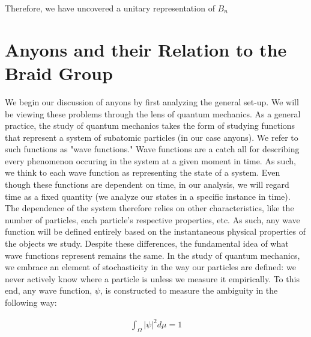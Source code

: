 \documentclass[10pt]{ucthesis}
\begin{document}
Therefore, we have uncovered a unitary representation of $B_n$

\section{Anyons and their Relation to the Braid Group}

We begin our discussion of anyons by first analyzing the general set-up. We will be viewing these problems through the lens of quantum mechanics. As a general practice, the study of quantum mechanics takes the form of studying functions that represent a system of subatomic particles (in our case anyons). We refer to such functions as "wave functions." Wave functions are a catch all for describing every phenomenon occuring in the system at a given moment in time. As such, we think to each wave function as representing the state of a system. Even though these functions are dependent on time, in our analysis, we will regard time as a fixed quantity (we analyze our states in a specific instance in time). The dependence of the system therefore relies on other characteristics, like the number of particles, each particle's respective properties, etc. As such, any wave function will be defined entirely based on the instantaneous physical properties of the objects we study. Despite these differences, the fundamental idea of what wave functions represent remains the same. In the study of quantum mechanics, we embrace an element of stochasticity in the way our particles are defined: we never actively know where a particle is unless we measure it empirically. To this end, any wave function, $\psi$, is constructed to measure the ambiguity in the following way:

\begin{equation}
	\begin{aligned}
		\int_\Omega |\psi|^2 d\mu = 1
	\end{aligned}
\end{equation}
\end{document}
